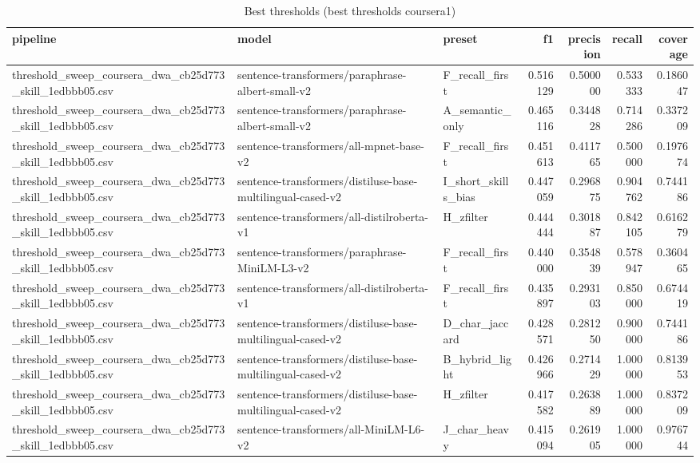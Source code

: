 \begin{table}[!ht]
\centering
\caption{Best thresholds (best thresholds coursera1)}
\label{tab:best\_thresholds\_coursera1}
\begin{tabular}{lllrrrr}
\hline
pipeline & model & preset & f1 & precision & recall & coverage \\
\hline
threshold\_sweep\_coursera\_dwa\_cb25d773\_skill\_1edbbb05.csv & sentence-transformers/paraphrase-albert-small-v2 & F\_recall\_first & 0.516129 & 0.500000 & 0.533333 & 0.186047 \\
threshold\_sweep\_coursera\_dwa\_cb25d773\_skill\_1edbbb05.csv & sentence-transformers/paraphrase-albert-small-v2 & A\_semantic\_only & 0.465116 & 0.344828 & 0.714286 & 0.337209 \\
threshold\_sweep\_coursera\_dwa\_cb25d773\_skill\_1edbbb05.csv & sentence-transformers/all-mpnet-base-v2 & F\_recall\_first & 0.451613 & 0.411765 & 0.500000 & 0.197674 \\
threshold\_sweep\_coursera\_dwa\_cb25d773\_skill\_1edbbb05.csv & sentence-transformers/distiluse-base-multilingual-cased-v2 & I\_short\_skills\_bias & 0.447059 & 0.296875 & 0.904762 & 0.744186 \\
threshold\_sweep\_coursera\_dwa\_cb25d773\_skill\_1edbbb05.csv & sentence-transformers/all-distilroberta-v1 & H\_zfilter & 0.444444 & 0.301887 & 0.842105 & 0.616279 \\
threshold\_sweep\_coursera\_dwa\_cb25d773\_skill\_1edbbb05.csv & sentence-transformers/paraphrase-MiniLM-L3-v2 & F\_recall\_first & 0.440000 & 0.354839 & 0.578947 & 0.360465 \\
threshold\_sweep\_coursera\_dwa\_cb25d773\_skill\_1edbbb05.csv & sentence-transformers/all-distilroberta-v1 & F\_recall\_first & 0.435897 & 0.293103 & 0.850000 & 0.674419 \\
threshold\_sweep\_coursera\_dwa\_cb25d773\_skill\_1edbbb05.csv & sentence-transformers/distiluse-base-multilingual-cased-v2 & D\_char\_jaccard & 0.428571 & 0.281250 & 0.900000 & 0.744186 \\
threshold\_sweep\_coursera\_dwa\_cb25d773\_skill\_1edbbb05.csv & sentence-transformers/distiluse-base-multilingual-cased-v2 & B\_hybrid\_light & 0.426966 & 0.271429 & 1.000000 & 0.813953 \\
threshold\_sweep\_coursera\_dwa\_cb25d773\_skill\_1edbbb05.csv & sentence-transformers/distiluse-base-multilingual-cased-v2 & H\_zfilter & 0.417582 & 0.263889 & 1.000000 & 0.837209 \\
threshold\_sweep\_coursera\_dwa\_cb25d773\_skill\_1edbbb05.csv & sentence-transformers/all-MiniLM-L6-v2 & J\_char\_heavy & 0.415094 & 0.261905 & 1.000000 & 0.976744 \\

\end{tabular}
\end{table}
